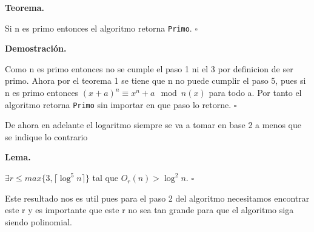 \documentclass{article}
\newenvironment{dem}{\par\noindent\textbf{Demostración.}\par}{\hfill$\square$\par}
\newenvironment{teo}{\par\noindent\textbf{Teorema.}\par}{\hfill$\square$\par}
\newenvironment{lem}{\par\noindent\textbf{Lema.}\par}{\hfill$\square$\par}
\begin{document}
\begin{teo}
    Si n es primo entonces el algoritmo retorna \texttt{Primo}.
\end{teo}
\begin{dem}
    Como n es primo entonces no se cumple el paso 1 ni el 3 por definicion de ser primo. Ahora por el teorema 1 se tiene que n no puede cumplir el paso 5, pues si n es primo entonces $(x+a)^n \equiv x^n + a \mod n(x)$ para todo a. Por tanto el algoritmo retorna \texttt{Primo} sin importar en que paso lo retorne.
\end{dem}
De ahora en adelante el logaritmo siempre se va a tomar en base 2 a menos que se indique lo contrario
\begin{lem}
    $\exists r \leq max\{3, \lceil \log^5 n \rceil\}$ tal que $O_r(n) > \log^2 n$.
\end{lem}
Este resultado nos es util pues para el paso 2 del algoritmo necesitamos encontrar este r y es importante que este r no sea tan grande para que el algoritmo siga siendo polinomial.\\
\end{document}
